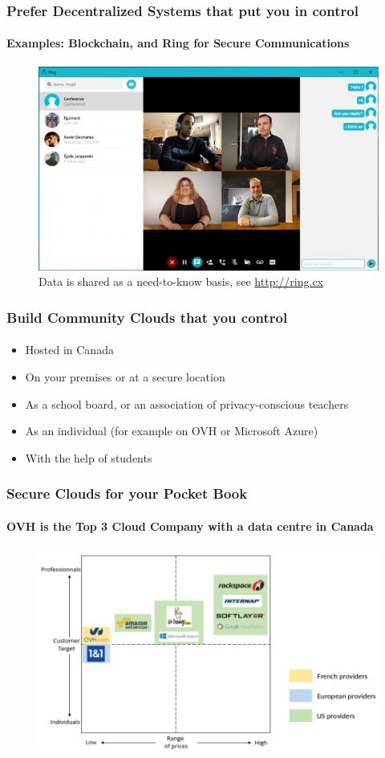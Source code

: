 \documentclass{beamer}
\begin{document}
	\begin{frame}
	\frametitle{Prefer Decentralized Systems that put you in control}
	\framesubtitle{Examples: Blockchain, and Ring for Secure Communications}
	        \begin{figure}[h]
                \centering
                \includegraphics[width=.8\textwidth]{./images/ring_interface_desktop}
		\caption{Data is shared as a need-to-know basis, see \url{http://ring.cx}}
        	\end{figure}
	\end{frame}

	\begin{frame}
	\frametitle{Build Community Clouds that you control}
	\framesubtitle{}
		\begin{itemize}[<+->]
			\item Hosted in Canada
			\item On your premises or at a secure location
			\item As a school board, or an association of privacy-conscious teachers
			\item As an individual (for example on OVH or Microsoft Azure)
			\item With the help of students 
		\end{itemize}
	\end{frame}

	\begin{frame}
	\frametitle{Secure Clouds for your Pocket Book}
	\framesubtitle{OVH is the Top 3 Cloud Company with a data centre in Canada}
	        \begin{figure}[h]
                \centering
                \includegraphics[width=.8\textwidth]{./images/OVH-cloud-magic-quadrant}
        	\end{figure}
	\end{frame}
\end{document}
